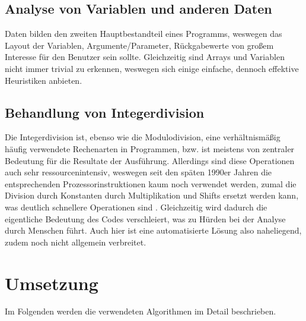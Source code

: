 \documentclass[11pt]{article} %
\begin{document}
\begin{multicols}{2}
\subsection{Analyse von Variablen und anderen Daten}
Daten bilden den zweiten Hauptbestandteil eines Programms, weswegen das Layout der Variablen, Argumente/Parameter, Rückgabewerte von großem Interesse für den Benutzer sein sollte. Gleichzeitig sind Arrays und Variablen nicht immer trivial zu erkennen, weswegen sich einige einfache, dennoch effektive Heuristiken anbieten.

\subsection{Behandlung von Integerdivision}
Die Integerdivision ist, ebenso wie die Modulodivision, eine verhältnismäßig häufig verwendete Rechenarten in Programmen, bzw. ist meistens von zentraler Bedeutung für die Resultate der Ausführung. Allerdings sind diese Operationen auch sehr ressourcenintensiv, weswegen seit den späten 1990er Jahren die entsprechenden Prozessorinstruktionen kaum noch verwendet werden, zumal die Division durch Konstanten durch Multiplikation und Shifts ersetzt werden kann, was deutlich schnellere Operationen sind \cite{division:2}. Gleichzeitig wird dadurch die eigentliche Bedeutung des Codes verschleiert, was zu Hürden bei der Analyse durch Menschen führt. Auch hier ist eine automatisierte Lösung also naheliegend, zudem noch nicht allgemein verbreitet.

\section{Umsetzung}
Im Folgenden werden die verwendeten Algorithmen im Detail beschrieben.


\end{multicols}
\end{document}
